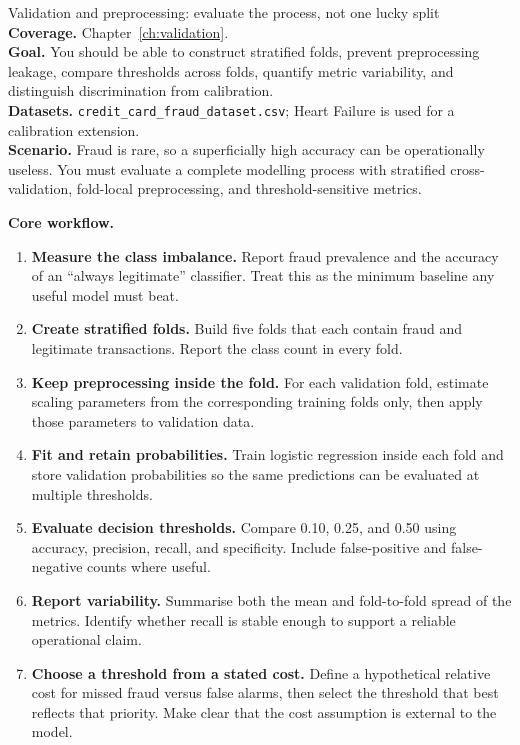
\begin{labproject}{Validation and preprocessing: evaluate the process, not one lucky split}
\textbf{Coverage.} Chapter~\ref{ch:validation}.\\
\textbf{Goal.} You should be able to construct stratified folds, prevent preprocessing leakage, compare thresholds across folds, quantify metric variability, and distinguish discrimination from calibration.\\
\textbf{Datasets.} \texttt{credit\_card\_fraud\_dataset.csv}; Heart Failure is used for a calibration extension.\\
\textbf{Scenario.} Fraud is rare, so a superficially high accuracy can be operationally useless. You must evaluate a complete modelling process with stratified cross-validation, fold-local preprocessing, and threshold-sensitive metrics.

\textbf{Core workflow.}
\begin{enumerate}
  \item \textbf{Measure the class imbalance.} Report fraud prevalence and the accuracy of an ``always legitimate'' classifier. Treat this as the minimum baseline any useful model must beat.
  \item \textbf{Create stratified folds.} Build five folds that each contain fraud and legitimate transactions. Report the class count in every fold.
  \item \textbf{Keep preprocessing inside the fold.} For each validation fold, estimate scaling parameters from the corresponding training folds only, then apply those parameters to validation data.
  \item \textbf{Fit and retain probabilities.} Train logistic regression inside each fold and store validation probabilities so the same predictions can be evaluated at multiple thresholds.
  \item \textbf{Evaluate decision thresholds.} Compare 0.10, 0.25, and 0.50 using accuracy, precision, recall, and specificity. Include false-positive and false-negative counts where useful.
  \item \textbf{Report variability.} Summarise both the mean and fold-to-fold spread of the metrics. Identify whether recall is stable enough to support a reliable operational claim.
  \item \textbf{Choose a threshold from a stated cost.} Define a hypothetical relative cost for missed fraud versus false alarms, then select the threshold that best reflects that priority. Make clear that the cost assumption is external to the model.
\end{enumerate}


\end{labproject}
